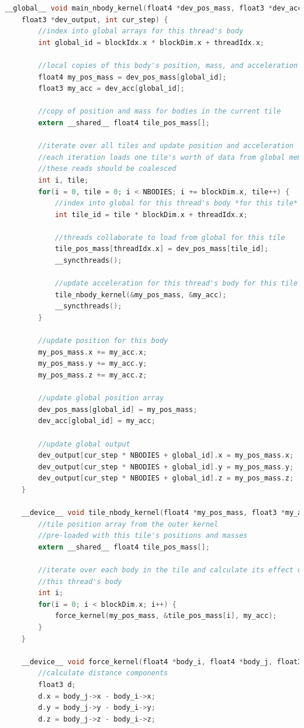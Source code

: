 \documentclass[10pt,a4paper]{article}
\begin{document}
\begin{lstlisting}[language=c]
	__global__ void main_nbody_kernel(float4 *dev_pos_mass, float3 *dev_acc,
	float3 *dev_output, int cur_step) {
		//index into global arrays for this thread's body
		int global_id = blockIdx.x * blockDim.x + threadIdx.x;
		
		//local copies of this body's position, mass, and acceleration
		float4 my_pos_mass = dev_pos_mass[global_id];
		float3 my_acc = dev_acc[global_id];
		
		//copy of position and mass for bodies in the current tile
		extern __shared__ float4 tile_pos_mass[]; 
		
		//iterate over all tiles and update position and acceleration
		//each iteration loads one tile's worth of data from global memory
		//these reads should be coalesced
		int i, tile;
		for(i = 0, tile = 0; i < NBODIES; i += blockDim.x, tile++) {
			//index into global for this thread's body *for this tile*
			int tile_id = tile * blockDim.x + threadIdx.x;
			
			//threads collaborate to load from global for this tile
			tile_pos_mass[threadIdx.x] = dev_pos_mass[tile_id];
			__syncthreads();
			
			//update acceleration for this thread's body for this tile
			tile_nbody_kernel(&my_pos_mass, &my_acc);
			__syncthreads();
		}
		
		//update position for this body
		my_pos_mass.x += my_acc.x;
		my_pos_mass.y += my_acc.y;
		my_pos_mass.z += my_acc.z;
		
		//update global position array
		dev_pos_mass[global_id] = my_pos_mass;
		dev_acc[global_id] = my_acc;
		
		//update global output
		dev_output[cur_step * NBODIES + global_id].x = my_pos_mass.x;
		dev_output[cur_step * NBODIES + global_id].y = my_pos_mass.y;
		dev_output[cur_step * NBODIES + global_id].z = my_pos_mass.z;
	}
	
	__device__ void tile_nbody_kernel(float4 *my_pos_mass, float3 *my_acc) {
		//tile position array from the outer kernel
		//pre-loaded with this tile's positions and masses
		extern __shared__ float4 tile_pos_mass[];
		
		//iterate over each body in the tile and calculate its effect on
		//this thread's body
		int i;
		for(i = 0; i < blockDim.x; i++) {
			force_kernel(my_pos_mass, &tile_pos_mass[i], my_acc);
		}
	}
	
	__device__ void force_kernel(float4 *body_i, float4 *body_j, float3 *acc_i) {
		//calculate distance components
		float3 d;
		d.x = body_j->x - body_i->x;
		d.y = body_j->y - body_i->y;
		d.z = body_j->z - body_i->z;
		

\end{lstlisting}
\end{document}
